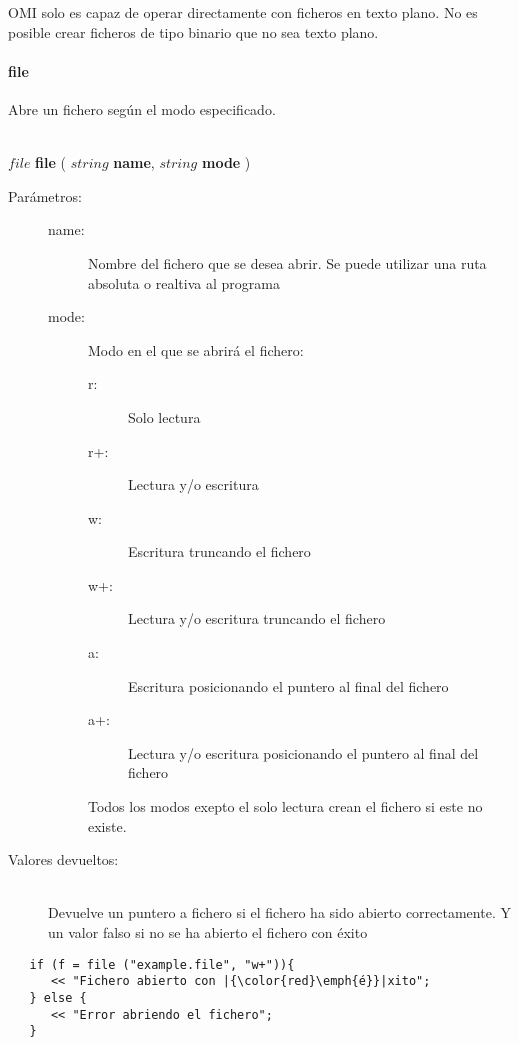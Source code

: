 OMI solo es capaz de operar directamente con ficheros en texto plano. No es posible crear 
ficheros de tipo binario que no sea texto plano.

\paragraph{file}
Abre un fichero según el modo especificado. 

\begin{framed}
\hfill \\ $file$ \textbf{file} ( $string$ \textbf{name}, $string$ \textbf{mode}  )  
\begin{description}
\item [Parámetros:] \hfill 
   \begin{description}
   \item[name:] Nombre del fichero que se desea abrir. Se puede utilizar una ruta absoluta o realtiva al programa
   \item[mode:] Modo en el que se abrirá el fichero:
      \begin{description}
         \item [r:] Solo lectura
         \item [r+:] Lectura y/o escritura
         \item [w:] Escritura truncando el fichero
         \item [w+:] Lectura y/o escritura truncando el fichero
         \item [a:] Escritura posicionando el puntero al final del fichero
         \item [a+:] Lectura y/o escritura posicionando el puntero al final del fichero
      \end{description} \hfill 
      
      Todos los modos exepto el solo lectura crean el fichero si este no existe. 
   \end{description}
\item[Valores devueltos:] \hfill \\
   Devuelve un puntero a fichero si el fichero ha sido abierto correctamente. Y un valor falso si no se ha 
   abierto el fichero con éxito
\end{description}
\end{framed}

\begin{lstlisting}  
   if (f = file ("example.file", "w+")){
      << "Fichero abierto con |{\color{red}\emph{é}}|xito";
   } else {
      << "Error abriendo el fichero";
   }
\end{lstlisting}

